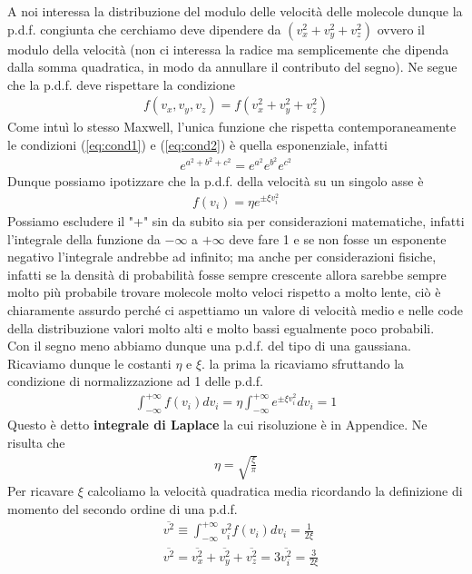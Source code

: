 \documentclass[10pt,a4paper]{article}
\begin{document}
A noi interessa la distribuzione del modulo delle velocità delle molecole dunque la p.d.f. congiunta che cerchiamo deve dipendere da $(v_x^2+v_y^2+v_z^2)$ ovvero il modulo della velocità (non ci interessa la radice ma semplicemente che dipenda dalla somma quadratica, in modo da annullare il contributo del segno). Ne segue che la p.d.f. deve rispettare la condizione
\begin{align}\label{eq:cond2}
	f(v_x,v_y,v_z) = f(v_x^2+v_y^2+v_z^2)
\end{align} 
Come intuì lo stesso Maxwell, l'unica funzione che rispetta contemporaneamente le condizioni (\ref{eq:cond1}) e (\ref{eq:cond2}) è quella esponenziale, infatti
\begin{align*} 
	e^{a^2+b^2+c^2}=e^{a^2} e^{b^2} e^{c^2}
\end{align*} 
Dunque possiamo ipotizzare che la p.d.f. della velocità su un singolo asse è
\begin{align*} 
	f(v_i) = \eta e^{\pm \xi v_i^2}
\end{align*} 
Possiamo escludere il "+" sin da subito sia per considerazioni matematiche, infatti l'integrale della funzione da $- \infty$ a $+ \infty$ deve fare 1 e se non fosse un esponente negativo l'integrale andrebbe ad infinito; ma anche per considerazioni fisiche, infatti se la densità di probabilità fosse sempre crescente allora sarebbe sempre molto più probabile trovare molecole molto veloci rispetto a molto lente, ciò è chiaramente assurdo perché ci aspettiamo un valore di velocità medio e nelle code della distribuzione valori molto alti e molto bassi egualmente poco probabili.\\
Con il segno meno abbiamo dunque una p.d.f. del tipo di una gaussiana. Ricaviamo dunque le costanti $\eta$ e $\xi$. la prima la ricaviamo sfruttando la condizione di normalizzazione ad 1 delle p.d.f.
\begin{align*} 
	\int_{-\infty}^{+\infty} f(v_i)dv_i = \eta \int_{-\infty}^{+\infty} e^{\pm \xi v_i^2} dv_i = 1
\end{align*} 
Questo è detto \textbf{integrale di Laplace} la cui risoluzione è in Appendice. Ne risulta che
\begin{align*} 
	\eta = \sqrt{\frac{\xi}{\pi}}
\end{align*} 
Per ricavare $\xi$ calcoliamo la velocità quadratica media ricordando la definizione di momento del secondo ordine di una p.d.f.
\begin{align*} 
	&\overline{v^2} \equiv \int_{-\infty}^{+\infty} v_i^2 f(v_i)dv_i = \frac{1}{2\xi}\\
	&\overline{v^2} = \overline{v_x^2}+\overline{v_y^2}+\overline{v_z^2} = 3\overline{ v_i^2} = \frac{3}{2\xi}
\end{align*} 
\end{document}
